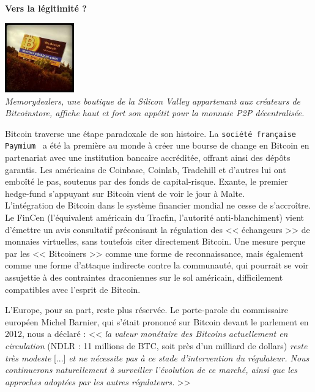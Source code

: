 \documentclass[11pt,twoside,a4paper]{article}
\begin{document}
\clearpage

\textbf{Vers la l{\'e}gitimit{\'e} ?} ~\\

\begin{minipage}[ht]{3.25cm}
	\includegraphics[width=3.00cm]{img/190-755345.jpg}~\\
	\emph{\small Memorydealers, une boutique de la Silicon Valley appartenant aux cr{\'e}ateurs de Bitcoinstore, affiche haut et fort son app{\'e}tit pour la monnaie P2P d{\'e}centralis{\'e}e. } ~\\
\end{minipage} \hfill \begin{minipage}[ht]{16.00cm}
	Bitcoin traverse une {\'e}tape paradoxale de son histoire. La \texttt{soci{\'e}t{\'e} fran\c{c}aise Paymium~\footnotemark} a {\'e}t{\'e} la premi{\`e}re au monde {\`a} cr{\'e}er une bourse de change en Bitcoin en partenariat avec une institution bancaire accr{\'e}dit{\'e}e, offrant ainsi des d{\'e}p{\^o}ts garantis. Les am{\'e}ricains de Coinbase, Coinlab, Tradehill et d'autres lui ont embo{\^i}t{\'e} le pas, soutenus par des fonds de capital-risque. Exante, le premier hedge-fund s'appuyant sur Bitcoin vient de voir le jour {\`a} Malte. ~\\
	
	L'int{\'e}gration de Bitcoin dans le syst{\`e}me financier mondial ne cesse de s'accro{\^i}tre. Le FinCen (l'{\'e}quivalent am{\'e}ricain du Tracfin, l'autorit{\'e} anti-blanchiment) vient d'{\'e}mettre un avis consultatif pr{\'e}conisant la r{\'e}gulation des << {\'e}changeurs >> de monnaies virtuelles, sans toutefois citer directement Bitcoin. Une mesure per\c{c}ue par les << Bitcoiners >> comme une forme de reconnaissance, mais {\'e}galement comme une forme d'attaque indirecte contre la communaut{\'e}, qui pourrait se voir assujettie {\`a} des contraintes draconiennes sur le sol am{\'e}ricain, difficilement compatibles avec l'esprit de Bitcoin. ~\\
\end{minipage}

L'Europe, pour sa part, reste plus r{\'e}serv{\'e}e. Le porte-parole du commissaire europ{\'e}en Michel Barnier, qui s'{\'e}tait prononc{\'e} sur Bitcoin devant le parlement en 2012, nous a d{\'e}clar{\'e} : << \emph{la valeur mon{\'e}taire des Bitcoins actuellement en circulation} (NDLR : 11 millions de BTC, soit pr{\`e}s d'un milliard de dollars) \emph{reste tr{\`e}s modeste} [...] \emph{et ne n{\'e}cessite pas {\`a} ce stade d'intervention du r{\'e}gulateur. Nous continuerons naturellement {\`a} surveiller l'{\'e}volution de ce march{\'e}, ainsi que les approches adopt{\'e}es par les autres r{\'e}gulateurs.} >> ~\\
\end{document}
